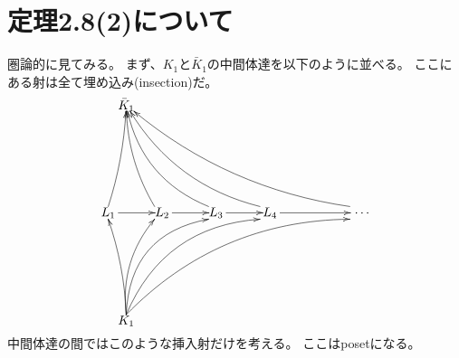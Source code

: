 \documentclass[a4j]{jarticle}
\begin{document}
    \section{定理2.8(2)について}
    圏論的に見てみる。
    まず、$K_1$と$\bar{K}_1$の中間体達を以下のように並べる。
    ここにある射は全て埋め込み(insection)だ。
    \[
    \begin{xy}
        (00, 30)    *{L_1}="L1",
        (15, 30)    *{L_2}="L2",
        (30, 30)    *{L_3}="L3",
        (45, 30)    *{L_4}="L4",
        (70, 30)    *{~\dots}="Li",
        (5, 60)     *{\bar{K}_1}="cK1",
        (5, 00)     *{K_1}="K1",

        \ar@{->}            "L1"+<0.8em,0em>;"L2"
        \ar@{->}            "L2"+<0.8em,0em>;"L3"
        \ar@{->}            "L3"+<0.8em,0em>;"L4"
        \ar@{->}            "L4"+<0.8em,0em>;"Li"

        \ar@{->}@/_1mm/ "K1"+<0.0em,0.5em>;"L1"+<-0.0em,-0.5em>
        \ar@{->}@/^3mm/ "K1"+<0.0em,0.5em>;"L2"+<-0.6em,-0.5em>
        \ar@{->}@/^7mm/ "K1"+<0.0em,0.5em>;"L3"+<-0.6em,-0.5em>
        \ar@{->}@/^7mm/ "K1"+<0.0em,0.5em>;"L4"+<-0.8em,-0.5em>
        \ar@{->}@/^7mm/ "K1"+<0.0em,0.5em>;"Li"+<-0.8em,-0.5em>
        \ar@{->}@/_1mm/ "L1"+<-0.0em,0.5em>;"cK1"
        \ar@{->}@/^2mm/ "L2"+<-0.6em,0.5em>;"cK1"
        \ar@{->}@/^5mm/ "L3"+<-0.6em,0.5em>;"cK1"
        \ar@{->}@/^5mm/ "L4"+<-0.8em,0.5em>;"cK1"
        \ar@{->}@/^5mm/ "Li"+<-0.8em,0.5em>;"cK1"
    \end{xy}
    \]
    中間体達の間ではこのような挿入射だけを考える。
    ここはposetになる。
\end{document}
